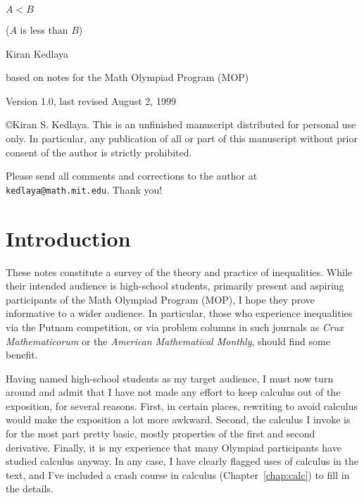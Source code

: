 \documentclass[12pt]{report}
\numberwithin{exc}{section}
\begin{document}
\begin{titlepage}

\begin{center}
$A < B$

($A$ is less than $B$)

\vspace{1in}

Kiran Kedlaya

based on notes for the Math Olympiad Program (MOP)

Version 1.0, last revised August 2, 1999
\vspace{1in}

\copyright Kiran S. Kedlaya. This is an unfinished manuscript distributed for
personal use only. In particular, any publication of all or part of this 
manuscript without prior consent of the author is strictly prohibited.

\bigskip

Please send all comments and corrections
to the author at \texttt{kedlaya@math.mit.edu}.
Thank you!

\end{center}

\end{titlepage}
	
\chapter*{Introduction}
These notes constitute a survey of the theory and practice of inequalities. 
While their intended audience is high-school students, primarily 
present and aspiring participants of the Math Olympiad Program (MOP), 
I hope they prove informative to a wider audience. In particular, 
those who experience inequalities via the Putnam competition, or via 
problem columns in such journals as \textit{Crux Mathematicorum}
or the \textit{American 
Mathematical Monthly}, should find some benefit.

Having named high-school students as my target audience, I must now 
turn around and admit that I have not made any effort to 
keep calculus out of the exposition, for several reasons.
First, in certain places, rewriting to avoid calculus would make the 
exposition a lot more awkward. Second, the calculus I invoke is for 
the most part pretty basic, mostly properties of the first and second 
derivative. Finally, it is my experience that many Olympiad 
participants have studied calculus anyway. In any case, I have clearly 
flagged uses of calculus in the text, and I've included a crash 
course in calculus (Chapter~\ref{chap:calc}) to fill in the details.
\end{document}
